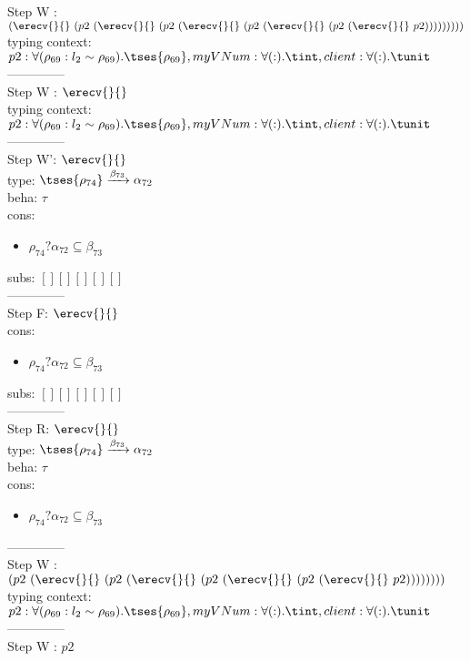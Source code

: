 \documentclass[12pt]{article}
\begin{document}
Step W : $ (\erecv{}{}~(p2~(\erecv{}{}~(p2~(\erecv{}{}~(p2~(\erecv{}{}~(p2~(\erecv{}{}~p2))))))))) $\\
 typing context: $ p2:\forall (\rho_{69} : l_{2} \sim\rho_{69}).  \tses{ \rho_{69}}, myVNum:\forall ( : ). \tint, client:\forall ( : ). \tunit$ 
\\ --------------\\
Step W : $ \erecv{}{} $\\
 typing context: $ p2:\forall (\rho_{69} : l_{2} \sim\rho_{69}).  \tses{ \rho_{69}}, myVNum:\forall ( : ). \tint, client:\forall ( : ). \tunit$ 
\\ --------------\\
Step W': $ \erecv{}{} $\\
  type: $  \tses{ \rho_{74}} \xrightarrow{\beta_{73}} \alpha_{72} $ 
\\  beha: $ \tau $ 
\\  cons: \begin{itemize}
\item $ \rho_{74}?\alpha_{72} \subseteq \beta_{73} $
\end{itemize} 
  subs:  $ [ ] [] [] [] [] $  
 \\--------------\\ 
Step F: $ \erecv{}{} $
 \\ cons: \begin{itemize}
\item $ \rho_{74}?\alpha_{72} \subseteq \beta_{73} $
\end{itemize}
 subs:  $ [ ] [] [] [] [] $ 
  \\--------------\\ 
Step R: $ \erecv{}{} $\\
  type: $  \tses{ \rho_{74}} \xrightarrow{\beta_{73}} \alpha_{72} $ 
\\  beha: $ \tau $ 
\\  cons: \begin{itemize}
\item $ \rho_{74}?\alpha_{72} \subseteq \beta_{73} $
\end{itemize} 
  --------------\\ 
Step W : $ (p2~(\erecv{}{}~(p2~(\erecv{}{}~(p2~(\erecv{}{}~(p2~(\erecv{}{}~p2)))))))) $\\
 typing context: $ p2:\forall (\rho_{69} : l_{2} \sim\rho_{69}).  \tses{ \rho_{69}}, myVNum:\forall ( : ). \tint, client:\forall ( : ). \tunit$ 
\\ --------------\\
Step W : $ p2 $\\
\end{document}
